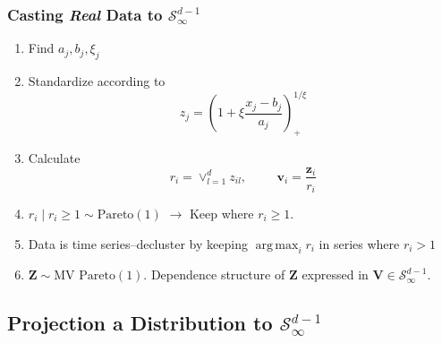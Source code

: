 \documentclass[aspectratio=169]{beamer}
\DeclareMathOperator*{\argmax}{arg\,max}
\begin{document}
\begin{frame}
  \frametitle{Casting \emph{Real} Data to $\mathcal{S}_{\infty}^{d-1}$}
  \begin{enumerate}
      \item Find $a_j, b_j, \xi_j$
      \item Standardize according to
        \begin{equation*}
         z_j = \left(1 + \xi\frac{x_j - b_{j}}{a_{j}}\right)_{+}^{1/\xi}
        \end{equation*}
      \item Calculate
        \begin{equation*}
            r_i = \vee_{l=1}^d z_{il},\hspace{1cm}\bm{v}_i = \frac{\bm{z}_i}{r_i}
        \end{equation*}
        
      \item $r_i\mid r_i \geq 1 \sim \text{Pareto}(1)$ $\rightarrow$ Keep where $r_i \geq 1$.
      \item Data is time series--decluster by keeping $\argmax_i r_i$ in series where $r_i > 1$
      \item $\bm{Z} \sim \text{MV Pareto}(1)$.  Dependence structure of $\bm{Z}$ expressed in $\bm{V}\in\mathcal{S}_{\infty}^{d-1}$.
  \end{enumerate}
\end{frame}

\subsection{Projection a Distribution to $\mathcal{S}_{\infty}^{d-1}$}
\end{document}
